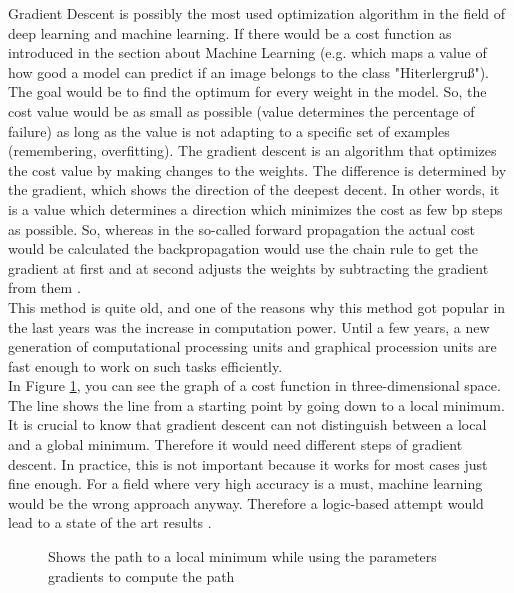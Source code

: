 Gradient Descent is possibly the most used optimization algorithm in the field of deep learning and machine learning. If there would be a cost function as introduced in the section about Machine Learning (e.g. which maps a value of how good a model can predict if an image belongs to the class "Hiterlergruß"). The goal would be to find the optimum for every weight in the model. So, the cost value would be as small as possible (value determines the percentage of failure) as long as the value is not adapting to a specific set of examples (remembering, overfitting). The gradient descent is an algorithm that optimizes the cost value by making changes to the weights. The difference is determined by the gradient, which shows the direction of the deepest decent. In other words, it is a value which determines a direction which minimizes the cost as few \gls{bp} steps as possible. So, whereas in the so-called forward propagation the actual cost would be calculated the backpropagation would use the chain rule to get the gradient at first and at second adjusts the weights by subtracting the gradient from them \cite{Goodfellow-et-al-2016}.\\

This method is quite old, and one of the reasons why this method got popular in the last years was the increase in computation power. Until a few years, a new generation of computational processing units and graphical procession units are fast enough to work on such tasks efficiently. \\

In Figure \ref{fig:gd}, you can see the graph of a cost function in three-dimensional space. The line shows the line from a starting point by going down to a local minimum. It is crucial to know that gradient descent can not distinguish between a local and a global minimum. Therefore it would need different steps of gradient descent. In practice, this is not important because it works for most cases just fine enough. For a  field where very high accuracy is a must, machine learning would be the wrong approach anyway. Therefore a logic-based attempt would lead to a state of the art results \cite{Russell} \cite{conf/mkm/KohlhaseKMT17}. 

\begin{figure}[htp]
	\centering
	\caption{Shows the path to a local minimum while using the parameters gradients to compute the path \cite{Gradient47:online}}
	\label{fig:gd}
\end{figure}

